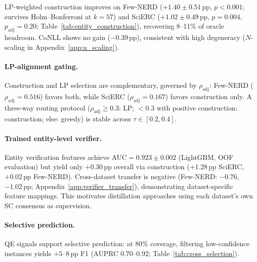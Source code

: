 \begin{table}[t]
\centering
\small
\caption{Entity construction vs.\ greedy ($\Delta$ macro F1; $N{=}8$, $T{=}1.0$, Qwen3-8B, multi-seed mean${\pm}\sigma$). $\theta{=}2/N$. $p$: paired bootstrap vs.\ greedy. Best in \textbf{bold}. $^\dagger$Survives Holm--Bonferroni correction ($k{=}57$). $^\ddagger$LP-weighted not computed; uniform only.}
\label{tab:entity_construction}
\end{table}

LP-weighted construction improves on Few-NERD ($+1.40{\pm}0.51$\,pp, $p{<}0.001$; survives Holm--Bonferroni at $k{=}57$) and SciERC ($+1.02{\pm}0.49$\,pp, $p{=}0.004$, $p_{\text{adj}}{=}0.20$; Table~\ref{tab:entity_construction}), recovering 8--11\% of oracle headroom. CoNLL shows no gain ($-0.39$\,pp), consistent with high degeneracy ($N$-scaling in Appendix~\ref{app:n_scaling}).

\paragraph{LP-alignment gating.}
Construction and LP selection are complementary, governed by $\rho_{\text{adj}}$: Few-NERD ($\rho_{\text{adj}}{=}0.516$) favors both, while SciERC ($\rho_{\text{adj}}{=}0.167$) favors construction only. A three-way routing protocol ($\rho_{\text{adj}} \geq 0.3$: LP; $<0.3$ with positive construction: construction; else: greedy) is stable across $\tau{\in}[0.2, 0.4]$.

\paragraph{Trained entity-level verifier.}
Entity verification features achieve AUC${=}0.923{\pm}0.002$ (LightGBM, OOF evaluation) but yield only $+0.30$\,pp overall via construction ($+1.28$\,pp SciERC, $+0.02$\,pp Few-NERD).
Cross-dataset transfer is negative (Few-NERD: $-0.76$, $-1.02$\,pp; Appendix~\ref{app:verifier_transfer}), demonstrating dataset-specific feature mappings. This motivates distillation approaches using each dataset's own SC consensus as supervision.

\paragraph{Selective prediction.}
QE signals support selective prediction: at 80\% coverage, filtering low-confidence instances yields $+5$--$8$\,pp F1 (AUPRC 0.70--0.92; Table~\ref{tab:cross_selection}).

\label{sec:selection_results}
